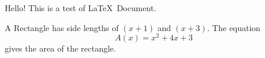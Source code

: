 \documentclass[11pt]{article}
\begin{document}
Hello! This is a test of \LaTeX\ Document.

A Rectangle has side lengths of $(x+1)$ and $(x+3)$.
The equation $${A(x)=x^2+4x+3}$$ gives the area of the rectangle.
\end{document}
